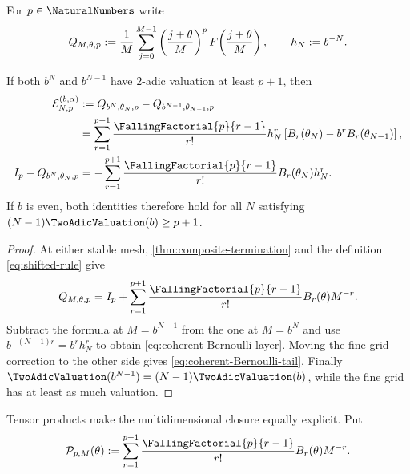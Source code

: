 For $p\in\NaturalNumbers$ write
\[
 Q_{M,\theta,p}:={1\over M}\sum_{j=0}^{M-1}
 \left({j+\theta\over M}\right)^p
 F\!\left({j+\theta\over M}\right),
 \qquad h_N:=b^{-N}.
\]

\begin{theorem}
\label{thm:coherent-Fabius-layer}
If both $b^N$ and $b^{N-1}$ have $2$-adic valuation at least $p+1$, then
\begin{align}
 \mathcal E_{N,p}^{(b,\alpha)}
 &:=Q_{b^N,\theta_N,p}-Q_{b^{N-1},\theta_{N-1},p} \notag\\
 &=\sum_{r=1}^{p+1}{\FallingFactorial{p}{r-1}\over r!}h_N^r
 \left[B_r(\theta_N)-b^rB_r(\theta_{N-1})\right],
 \label{eq:coherent-Bernoulli-layer}\\
 I_p-Q_{b^N,\theta_N,p}
 &=-\sum_{r=1}^{p+1}{\FallingFactorial{p}{r-1}\over r!}
 B_r(\theta_N)h_N^r.
 \label{eq:coherent-Bernoulli-tail}
\end{align}
If $b$ is even, both identities therefore hold for all $N$ satisfying
$(N-1)\TwoAdicValuation(b)\ge p+1$.
\end{theorem}

\begin{proof}
At either stable mesh, \cref{thm:composite-termination} and the definition
\eqref{eq:shifted-rule} give
\[
 Q_{M,\theta,p}=I_p+
 \sum_{r=1}^{p+1}{\FallingFactorial{p}{r-1}\over r!}B_r(\theta)M^{-r}.
\]
Subtract the formula at $M=b^{N-1}$ from the one at $M=b^N$ and use
$b^{-(N-1)r}=b^rh_N^r$ to obtain
\eqref{eq:coherent-Bernoulli-layer}.  Moving the fine-grid correction to
the other side gives \eqref{eq:coherent-Bernoulli-tail}.  Finally
$\TwoAdicValuation(b^{N-1})=(N-1)\TwoAdicValuation(b)$, while the fine
grid has at least as much valuation.
\end{proof}

Tensor products make the multidimensional closure equally explicit.  Put
\begin{equation}
 \mathcal P_{p,M}(\theta)
 :=\sum_{r=1}^{p+1}{\FallingFactorial{p}{r-1}\over r!}B_r(\theta)M^{-r}.
 \label{eq:tensor-one-dimensional-corrector}
\end{equation}

